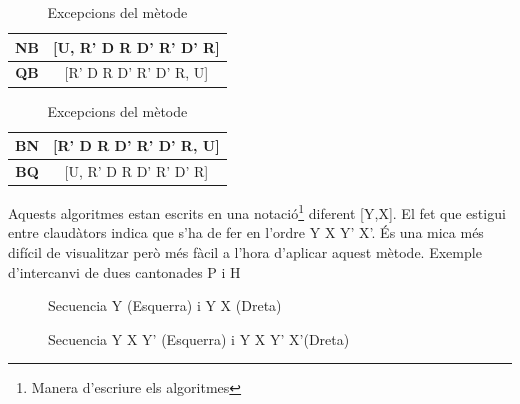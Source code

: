 \begin{table}[h]
    \begin{minipage}{.5\linewidth}
        \centering
        \begin{tabular}{|c|c|}
            \hline
            \textbf{NB} & [U, R' D R D' R' D' R] \\
            \hline
            \textbf{QB} & [R' D R D' R' D' R, U] \\
            \hline
        \end{tabular}
    \end{minipage}
    \begin{minipage}{.5\linewidth}
        \centering
        \begin{tabular}{|c|c|}
            \hline
            \textbf{BN} & [R' D R D' R' D' R, U] \\
            \hline
            \textbf{BQ} & [U, R' D R D' R' D' R] \\
            \hline 
        \end{tabular}
    \end{minipage} 
    \caption{Excepcions del mètode}
\end{table}



Aquests algoritmes estan escrits en una notació\footnote{Manera d'escriure els algoritmes} diferent [Y,X]. El fet que estigui entre claudàtors indica que s'ha de fer en l'ordre Y X Y' X'. És una mica més difícil de visualitzar però més fàcil a l'hora d'aplicar aquest mètode.
Exemple d'intercanvi de dues cantonades P i H

\begin{figure}[h!]
    \centering
    \begin{subfigure}
        \centering\RubikCubeSolvedWY
    \end{subfigure}
    \begin{subfigure}
        \centering\RubikCubeSolvedWY
    \end{subfigure}
    \caption{Secuencia Y (Esquerra) i Y X (Dreta)}
\end{figure}

\begin{figure}[h!]
    \centering
    \begin{subfigure}
        \centering\RubikCubeSolvedWY
    \end{subfigure}
    \begin{subfigure}
        \centering\RubikCubeSolvedWY
        \end{subfigure}
        \caption{Secuencia Y X Y' (Esquerra) i Y X Y' X'(Dreta)}
    \end{figure}

